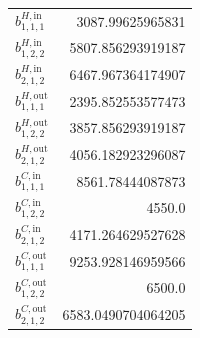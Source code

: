 \documentclass{article}%
\begin{document}
\begin{multicols*}{3}
\begin{supertabular}{lr}
	$b_{1,1,1}^{H,\text{in}}$ & 3087.99625965831 \\%
	$b_{1,2,2}^{H,\text{in}}$ & 5807.856293919187 \\%
	$b_{2,1,2}^{H,\text{in}}$ & 6467.967364174907 \\%
	$b_{1,1,1}^{H,\text{out}}$ & 2395.852553577473 \\%
	$b_{1,2,2}^{H,\text{out}}$ & 3857.856293919187 \\%
	$b_{2,1,2}^{H,\text{out}}$ & 4056.182923296087 \\%
	$b_{1,1,1}^{C,\text{in}}$ & 8561.78444087873 \\%
	$b_{1,2,2}^{C,\text{in}}$ & 4550.0 \\%
	$b_{2,1,2}^{C,\text{in}}$ & 4171.264629527628 \\%
	$b_{1,1,1}^{C,\text{out}}$ & 9253.928146959566 \\%
	$b_{1,2,2}^{C,\text{out}}$ & 6500.0 \\%
	$b_{2,1,2}^{C,\text{out}}$ & 6583.0490704064205 \\%
\end{supertabular}%
\end{multicols*}%
\clearpage%
\end{document}

